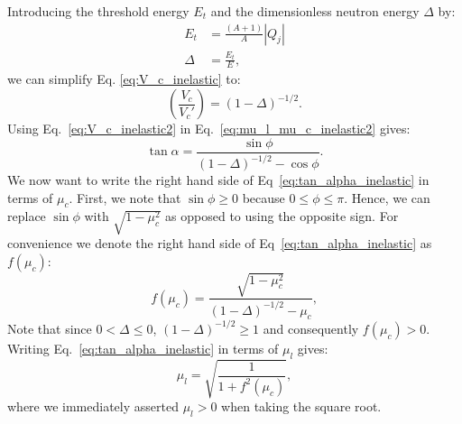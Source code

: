 \documentclass[review]{elsarticle}
\begin{document}
Introducing the threshold energy $E_t$ and the dimensionless neutron energy $\Delta$ by:
\begin{align}
  E_t & = \frac{(A+1)}{A}\left |Q_j\right |  \nonumber \\
  \Delta &= \frac{E_t}{E},
\end{align}
we can simplify Eq. \ref{eq:V_c_inelastic} to:
\begin{equation}\label{eq:V_c_inelastic2}
   \left( \frac{V_c}{V_c'} \right) = \left(1 - \Delta \right)^{-1/2}.
\end{equation}
Using Eq.~\ref{eq:V_c_inelastic2} in Eq.~\ref{eq:mu_l_mu_c_inelastic2} gives:
\begin{equation}\label{eq:tan_alpha_inelastic}
   \tan \alpha =  \frac{\sin \phi }{ \left(1 - \Delta \right)^{-1/2}  - \cos \phi}.
\end{equation}
We now want to write the right hand side of Eq~\ref{eq:tan_alpha_inelastic} in terms of $\mu_c$. First, we note that
$\sin \phi \ge 0$ because $0 \le \phi \le \pi$. Hence, we can replace $\sin \phi$ with $\sqrt{1 - \mu_c^2}$ as opposed to using the opposite sign.
For convenience we denote the right hand side of Eq~\ref{eq:tan_alpha_inelastic} as $f(\mu_c)$:
\begin{equation}
f(\mu_c) =  \frac{\sqrt{1 - \mu_c^2}}{ \left(1 - \Delta \right)^{-1/2}  - \mu_c},
\end{equation}
Note that since $0 < \Delta \le 0$, $\left(1 - \Delta \right)^{-1/2} \ge 1$ and consequently $f(\mu_c) > 0$.
Writing Eq.~\ref{eq:tan_alpha_inelastic} in terms of $\mu_l$ gives:
\begin{equation}\label{eq:mu_l_mu_c_inelastic_final}
  \mu_l = \sqrt{ \frac{1}{1 + f^2 (\mu_c)} },
\end{equation}
where we immediately asserted $\mu_l >0$ when taking the square root. 
\end{document}
